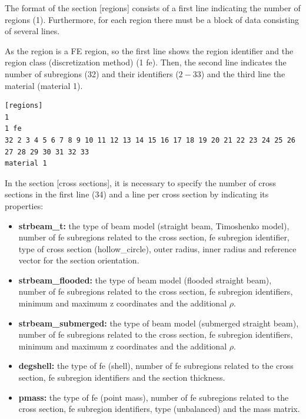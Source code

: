 \documentclass[a4]{article}
\begin{document}
The format of the section [regions] consists of a first line indicating the number of regions (1). Furthermore, for each region there must be a block of data consisting of several lines. 

As the region is a FE region, so the first line shows the region identifier and the region class (discretization method) (1 fe). Then, the second line indicates the number of subregions (32) and their identifiers ($2-33$) and the third line the material (material 1). 

\begin{Verbatim}	
[regions]
1
1 fe
32 2 3 4 5 6 7 8 9 10 11 12 13 14 15 16 17 18 19 20 21 22 23 24 25 26 27 28 29 30 31 32 33 
material 1
\end{Verbatim}

In the section [cross sections], it is necessary to specify the number of cross sections in the first line (34) and a line per cross section by indicating its properties:

\begin{itemize}
	\item \textbf{strbeam\_t:} the type of beam model (straight beam, Timoshenko model), number of fe subregions related to the cross section, fe subregion identifier, type of cross section (hollow\_circle), outer radius, inner radius and reference vector for the section orientation.
	
	\item \textbf{strbeam\_flooded:} the type of beam model (flooded straight beam), number of fe subregions related to the cross section, fe subregion identifiers, minimum and maximum z coordinates and the additional $ \rho $.
	
	\item \textbf{strbeam\_submerged:} the type of beam model (submerged straight beam), number of fe subregions related to the cross section, fe subregion identifiers, minimum and maximum z coordinates and the additional $ \rho $.
	
	\item \textbf{degshell:} the type of fe (shell), number of fe subregions related to the cross section, fe subregion identifiers and the section thickness.
	
	\item \textbf{pmass:} the type of fe (point mass), number of fe subregions related to the cross section, fe subregion identifiers, type (unbalanced) and the mass matrix.
\end{itemize} 
\end{document}
